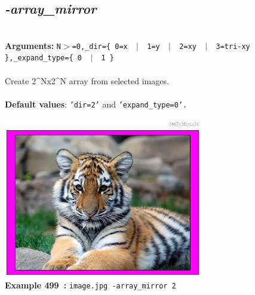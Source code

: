 \documentclass[a4paper,11pt,twoside]{book}
\begin{document}
\subsection{\emph{-array\_mirror} }\vspace*{-0.5em}
~\\\textbf{Arguments: } 
{\small \texttt{N$>$=0,\_dir=\{ 0=x ~$|$~ 1=y ~$|$~ 2=xy ~$|$~ 3=tri-xy \},\_expand\_type=\{ 0 ~$|$~ 1 \}}}\\~\\
Create 2\textasciicircum Nx2\textasciicircum N array from selected images.
~\\~\\\textbf{Default values}: {\small \texttt{'dir=2'} and \texttt{'expand\_type=0'.}}
\begin{center}\includegraphics[keepaspectratio=true,height=7cm,width=\textwidth]{img/gmic_def499.jpg}\\
{\footnotesize \textbf{Example 499~:} \texttt{image.jpg -array\_mirror 2}}
\end{center}
\end{document}
